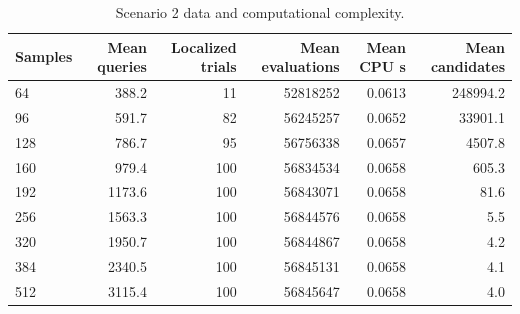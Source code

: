 \begin{table}[t]
\centering
\caption{Scenario 2 data and computational complexity.}
\label{tab:s2-complexity}
\begin{tabular}{lrrrrr}
\toprule
Samples & Mean queries & Localized trials & Mean evaluations & Mean CPU s & Mean candidates \\
\midrule
64 & 388.2 & 11 & 52818252 & 0.0613 & 248994.2 \\
96 & 591.7 & 82 & 56245257 & 0.0652 & 33901.1 \\
128 & 786.7 & 95 & 56756338 & 0.0657 & 4507.8 \\
160 & 979.4 & 100 & 56834534 & 0.0658 & 605.3 \\
192 & 1173.6 & 100 & 56843071 & 0.0658 & 81.6 \\
256 & 1563.3 & 100 & 56844576 & 0.0658 & 5.5 \\
320 & 1950.7 & 100 & 56844867 & 0.0658 & 4.2 \\
384 & 2340.5 & 100 & 56845131 & 0.0658 & 4.1 \\
512 & 3115.4 & 100 & 56845647 & 0.0658 & 4.0 \\
\bottomrule
\end{tabular}
\end{table}
